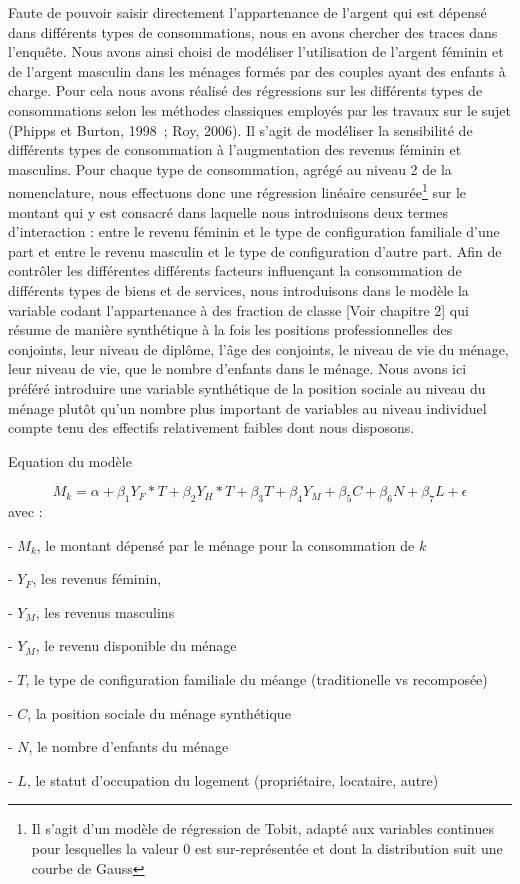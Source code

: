 \documentclass[
  12pt,
]{book}
\begin{document}
Faute de pouvoir saisir directement l'appartenance de l'argent qui est
dépensé dans différents types de consommations, nous en avons chercher
des traces dans l'enquête. Nous avons ainsi choisi de modéliser
l'utilisation de l'argent féminin et de l'argent masculin dans les
ménages formés par des couples ayant des enfants à charge. Pour cela
nous avons réalisé des régressions sur les différents types de
consommations selon les méthodes classiques employés par les travaux sur
le sujet (Phipps et Burton, 1998~; Roy, 2006). Il s'agit de modéliser la
sensibilité de différents types de consommation à l'augmentation des
revenus féminin et masculins. Pour chaque type de consommation, agrégé
au niveau 2 de la nomenclature, nous effectuons donc une régression
linéaire censurée\footnote{Il s'agit d'un modèle de régression de Tobit,
  adapté aux variables continues pour lesquelles la valeur 0 est
  sur-représentée et dont la distribution suit une courbe de Gauss} sur
le montant qui y est consacré dans laquelle nous introduisons deux
termes d'interaction : entre le revenu féminin et le type de
configuration familiale d'une part et entre le revenu masculin et le
type de configuration d'autre part. Afin de contrôler les différentes
différents facteurs influençant la consommation de différents types de
biens et de services, nous introduisons dans le modèle la variable
codant l'appartenance à des fraction de classe {[}Voir chapitre 2{]} qui
résume de manière synthétique à la fois les positions professionnelles
des conjoints, leur niveau de diplôme, l'âge des conjoints, le niveau de
vie du ménage, leur niveau de vie, que le nombre d'enfants dans le
ménage. Nous avons ici préféré introduire une variable synthétique de la
position sociale au niveau du ménage plutôt qu'un nombre plus important
de variables au niveau individuel compte tenu des effectifs relativement
faibles dont nous disposons.

\begin{encadre}{Equation du modèle}

$$
M_k = \alpha + \beta_1 Y_F*T + \beta_2 Y_H*T + \beta_3 T + \beta_4 Y_M + \beta_5 C + \beta_6 N + \beta_7 L + \epsilon
$$
avec : 

- $M_k$, le montant dépensé par le ménage pour la consommation de $k$

- $Y_F$, les revenus féminin, 

- $Y_M$, les revenus masculins

- $Y_M$, le revenu disponible du ménage

- $T$, le type de configuration familiale du méange (traditionelle vs recomposée)

- $C$, la position sociale du ménage synthétique

- $N$, le nombre d'enfants du ménage

- $L$, le statut d'occupation du logement (propriétaire, locataire, autre)

\end{encadre}
\end{document}
